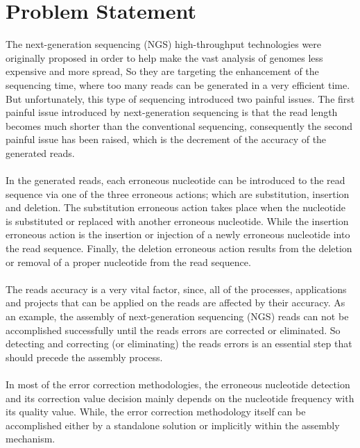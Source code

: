 \documentclass[12pt,openany]{llncs}
\begin{document}
\section{Problem Statement}
The next-generation sequencing (NGS) high-throughput technologies \cite{NGS} were originally proposed in order to help make the vast analysis of genomes less expensive and more spread, So they are targeting the enhancement of the sequencing time, where too many reads can be generated in a very efficient time. But unfortunately, this type of sequencing introduced two painful issues. The first painful issue introduced by next-generation sequencing is that the read length becomes much shorter than the conventional sequencing, consequently the second painful issue has been raised, which is the decrement of the accuracy of the generated reads. 
\\
\\
In the generated reads, each erroneous nucleotide can be introduced to the read sequence via one of the three erroneous actions; which are substitution, insertion and deletion. 
The substitution erroneous action takes place when the nucleotide is substituted or replaced with another erroneous nucleotide. While the insertion erroneous action is the insertion or injection of a newly erroneous nucleotide into the read sequence. Finally, the deletion erroneous action results from the deletion or removal of a proper nucleotide from the read sequence.
\\
\\
The reads accuracy is a very vital factor, since, all of the processes, applications and projects that can be applied on the reads are affected by their accuracy. As an example, the assembly of next-generation sequencing (NGS) reads can not be accomplished successfully until the reads errors are corrected or eliminated. So detecting and correcting (or eliminating) the reads errors is an essential step that should precede the assembly process. 
\\
\\
In most of the error correction methodologies, the erroneous nucleotide detection and its correction value decision mainly depends on the nucleotide frequency with its quality value\cite{ErrCorr}. While, the error correction methodology itself can be accomplished either by a standalone solution or implicitly within the assembly mechanism. 
\end{document}
